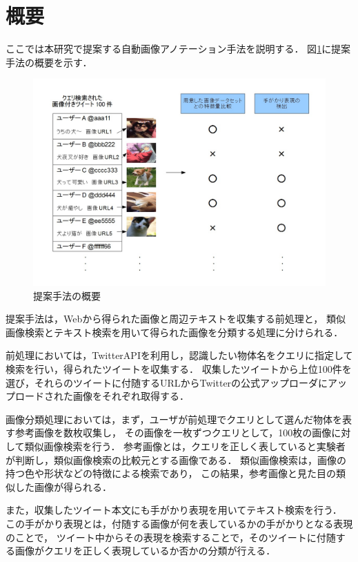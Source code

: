 \section{概要}
ここでは本研究で提案する自動画像アノテーション手法を説明する．
図\ref{fig:way}に提案手法の概要を示す．
%
\begin{figure}[tb]
 \begin{center}
  \includegraphics[scale=0.50]{way.jpg}
 \end{center}
 \caption{提案手法の概要}
 \label{fig:way}
\end{figure}
%
提案手法は，Webから得られた画像と周辺テキストを収集する前処理と，
類似画像検索とテキスト検索を用いて得られた画像を分類する処理に分けられる．

前処理においては，TwitterAPIを利用し，認識したい物体名をクエリに指定して検索を行い，得られたツイートを収集する．
収集したツイートから上位100件を選び，それらのツイートに付随するURLからTwitterの公式アップローダにアップロードされた画像をそれぞれ取得する．

画像分類処理においては，まず，ユーザが前処理でクエリとして選んだ物体を表す参考画像を数枚収集し，
その画像を一枚ずつクエリとして，100枚の画像に対して類似画像検索を行う．
参考画像とは，クエリを正しく表していると実験者が判断し，類似画像検索の比較元とする画像である．
類似画像検索は，画像の持つ色や形状などの特徴による検索であり，
この結果，参考画像と見た目の類似した画像が得られる．

また，収集したツイート本文にも手がかり表現を用いてテキスト検索を行う．
この手がかり表現とは，付随する画像が何を表しているかの手がかりとなる表現のことで，
ツイート中からその表現を検索することで，そのツイートに付随する画像がクエリを正しく表現しているか否かの分類が行える．

